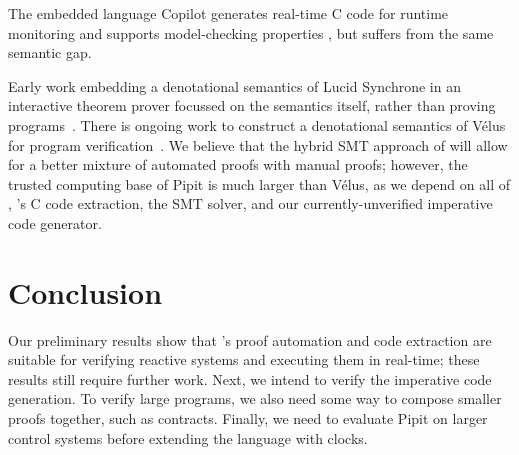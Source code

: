 \documentclass[sigplan,screen, review]{acmart}
\begin{document}
The embedded language Copilot generates real-time C code for runtime monitoring and supports model-checking properties \cite{laurent2015assuring}, but suffers from the same semantic gap.

Early work embedding a denotational semantics of Lucid Synchrone in an interactive theorem prover focussed on the semantics itself, rather than proving programs~\cite{boulme2001clocked}.
There is ongoing work to construct a denotational semantics of Vélus for program verification~\cite{bourke2022towards}.
We believe that the hybrid SMT approach of \fstar{} will allow for a better mixture of automated proofs with manual proofs;
however, the trusted computing base of Pipit is much larger than Vélus, as we depend on all of \fstar{}, \lowstar{}'s C code extraction, the SMT solver, and our currently-unverified imperative code generator.




\section{Conclusion}

Our preliminary results show that \fstar{}'s proof automation and code extraction are suitable for verifying reactive systems and executing them in real-time; these results still require further work.
Next, we intend to verify the imperative code generation.
To verify large programs, we also need some way to compose smaller proofs together, such as contracts.
Finally, we need to evaluate Pipit on larger control systems before extending the language with clocks.







\end{document}
